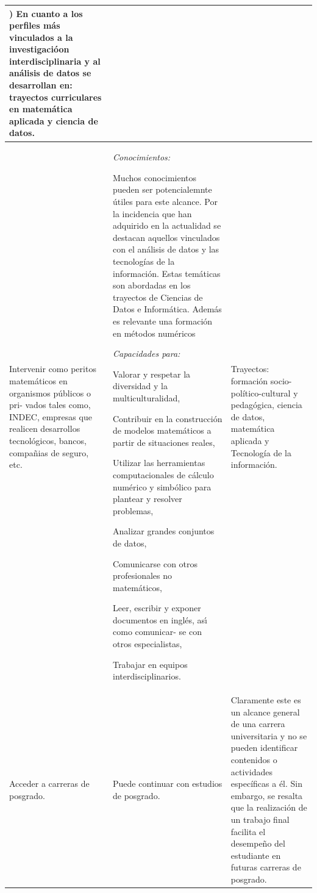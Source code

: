 \documentclass[a4paper, 12pt]{article}
\begin{document}
\begin{center}
\begin{tabularx}{1.0\textwidth}{|>{\raggedright\arraybackslash}X |
>{\raggedright\arraybackslash}X |
>{\raggedright\arraybackslash}X |
}
  3) En cuanto a los perfiles más vinculados a la investigacióon interdisciplinaria y al análisis de datos se desarrollan en: trayectos curriculares en matemática aplicada y ciencia de datos.
  
  \\ \hline
 Intervenir como peritos matemáticos en organismos públicos o pri-
vados tales como, INDEC, empresas que realicen desarrollos tecnológicos, bancos, compañias de seguro, etc.

  &   
   \emph{Conocimientos:}
   
   Muchos conocimientos pueden ser potencialemnte útiles para este alcance. Por la incidencia que han adquirido en la actualidad se destacan aquellos vinculados con el análisis de datos y las tecnologías de la información. Estas temáticas son abordadas en los trayectos de Ciencias de Datos e Informática. Además es relevante una formación en métodos numéricos
   
   
   \emph{Capacidades para:}


 Valorar y respetar la diversidad y la multiculturalidad,

Contribuir en la construcción de modelos matemáticos a partir de
situaciones reales,

 Utilizar las herramientas computacionales de cálculo numérico y simbólico para plantear y resolver problemas,
 
 Analizar grandes conjuntos de datos,

 Comunicarse con otros profesionales no matemáticos,

  Leer, escribir y exponer documentos en inglés, ası́ como comunicar-
se con otros especialistas,

 Trabajar en equipos interdisciplinarios.

  

  
  
  
  &  Trayectos: formación socio-político-cultural y pedagógica, ciencia de datos, matemática aplicada y Tecnología de la información.
  
  \\ \hline

  Acceder a carreras de posgrado.
  & Puede continuar con estudios de posgrado.
  & Claramente este es un  alcance general de una carrera universitaria y no se pueden identificar contenidos o actividades específicas a él. Sin embargo, se resalta que la realización de un trabajo final facilita el desempeño del estudiante en futuras carreras de posgrado.  
  

\end{tabularx}
\end{center}
\end{document}
